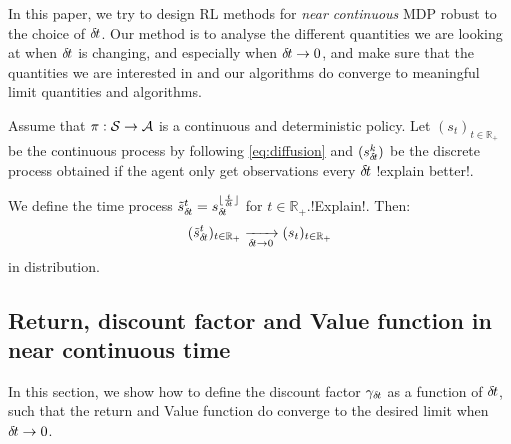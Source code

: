         In this paper, we try to design RL methods for \emph{near continuous} MDP
	robust to the choice of ${\delta\hspace{-.1em}t}$. Our method is to analyse the different
	quantities we are looking at when ${\delta\hspace{-.1em}t}$ is changing, and especially when
	${\delta\hspace{-.1em}t} \rightarrow 0$, and make sure that the quantities we are interested in
	and our algorithms do converge to meaningful limit quantities and algorithms.

      
	\begin{theorem}
		Assume that $\pi: {\cal S} \rightarrow {\cal A}$ is a continuous and
		deterministic policy. Let $(s_t)_{t\in\mathbb{R}_+}$ be the
		continuous process by following \eqref{eq:diffusion} and
		$(s_{\delta\hspace{-.1em}t}^k)$ be the discrete process obtained if the agent only
		get observations every ${\delta\hspace{-.1em}t}$ !explain better!.

		We define the time process $\tilde s_{\delta\hspace{-.1em}t}^t = s^{\lfloor
		\frac{t}{{\delta\hspace{-.1em}t}}\rfloor}_{\delta\hspace{-.1em}t}$ for
		$t\in\mathbb{R_+}$.!Explain!. Then:
		\begin{equation}
			\label{eq:conv-traj}
			(\tilde s_{\delta\hspace{-.1em}t}^t)_{t\in\mathbb{R}_+} 
			\xrightarrow[{\delta\hspace{-.1em}t} \rightarrow 0]{} (s_t)_{t\in\mathbb{R}_+}
		\end{equation}
		in distribution.
	\end{theorem}
      

\subsection{Return, discount factor  and Value function in near continuous time}
\label{sec:ret-gamma-v}

In this section, we show how to define the discount factor $\gamma_{\delta\hspace{-.1em}t}$ as a function of ${\delta\hspace{-.1em}t}$, such that the return and Value function do converge to the desired limit when ${\delta\hspace{-.1em}t} \rightarrow 0$. 


